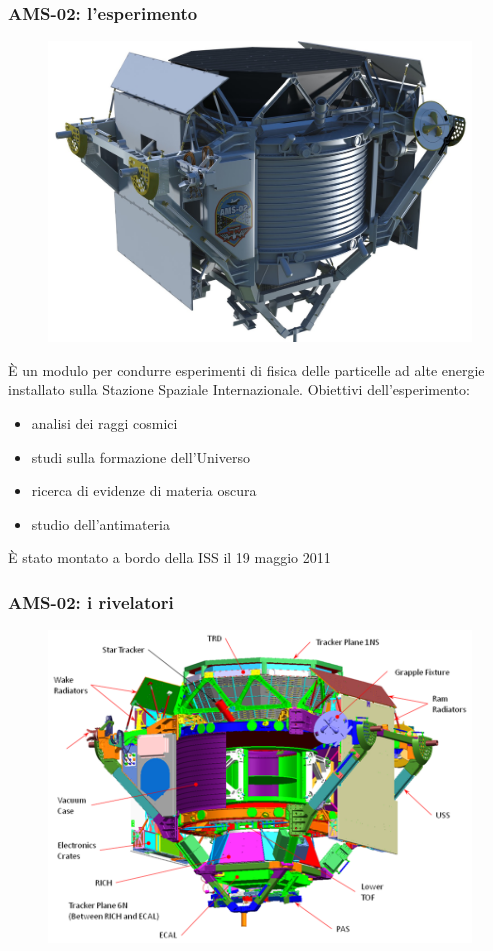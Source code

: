 \documentclass[10pt]{beamer}
\begin{document}
\begin{frame}
  \frametitle{AMS-02: l'esperimento}
  \begin{figure}
    \centering
    \includegraphics[width=0.3\columnwidth]{ams}
  \end{figure}
  È un modulo per condurre esperimenti di fisica delle particelle ad alte
  energie installato sulla Stazione Spaziale Internazionale.  Obiettivi
  dell'esperimento:
  \begin{itemize}
  \item analisi dei \alert{raggi cosmici}
  \item studi sulla \alert{formazione dell'Universo}
  \item ricerca di evidenze di \alert{materia oscura}
  \item studio dell'\alert{antimateria}
  \end{itemize}
  È stato montato a bordo della ISS il 19 maggio 2011
\end{frame}

\begin{frame}
  \frametitle{AMS-02: i rivelatori}
  \begin{figure}
    \centering
    \includegraphics[width=.85\columnwidth]{ams-rivelatori}
  \end{figure}
\end{frame}
\end{document}
